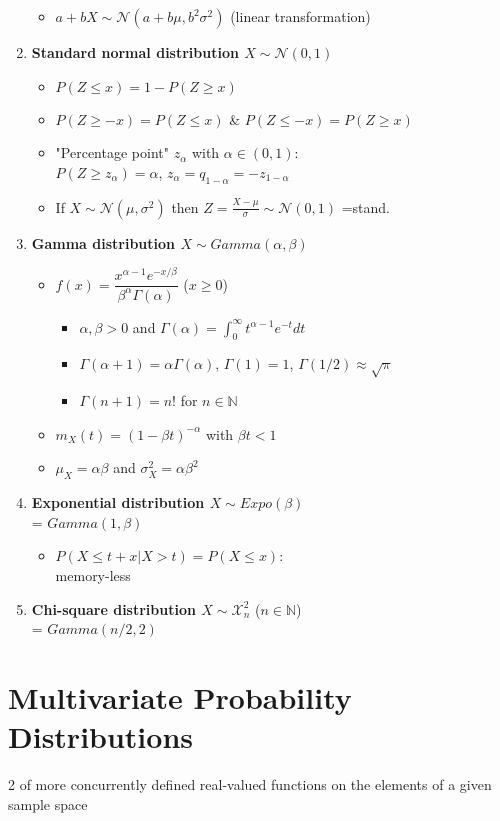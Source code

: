 \documentclass[paper=a4,fontsize=8pt,pagesize,DIV=calc]{scrartcl}
\begin{document}
\begin{multicols}{3}
\begin{enumerate}
\begin{itemize}
\item $a+bX\sim \mathcal{N}(a+b\mu ,b^2 \sigma^2)$ (linear transformation)
\end{itemize}
\item \textbf{Standard normal distribution $X \sim \mathcal{N}(0,1)$}
\begin{itemize}
\item $P(Z\leq x)=1-P(Z\geq x)$
\item $P(Z\geq -x)=P(Z\leq x)$ \& $P(Z\leq -x)=P(Z\geq x)$
\item "Percentage point" $z_\alpha$ with $\alpha \in (0,1)$: \\$P(Z\geq z_\alpha)=\alpha$, $z_\alpha=q_{1-\alpha}=-z_{1-\alpha}$
\item If $X\sim \mathcal{N}(\mu,\sigma^2)$ then $Z=\frac{X-\mu}{\sigma} \sim \mathcal{N}(0,1)$ =stand.
\end{itemize}
\item \textbf{Gamma distribution $X \sim Gamma(\alpha,\beta)$}
\begin{itemize}
\item $f(x)= \dfrac{x^{\alpha-1}e^{-x/\beta}}{\beta^\alpha \Gamma(\alpha)}$ ($x\geq 0$)
\begin{itemize}
\item $\alpha,\beta >0$ and $\Gamma(\alpha)=\int^{\infty}_0 t^{\alpha-1}e^{-t}dt$
\item $\Gamma(\alpha+1)=\alpha \Gamma(\alpha)$, $\Gamma(1)=1$, $\Gamma(1/2)\approx\sqrt{\pi}$
\item $\Gamma(n+1)=n!$ for $n\in \mathbb{N}$
\end{itemize} 
\item $m_X(t)=(1-\beta t)^{-\alpha}$ with $\beta t<1$
\item $\mu_X=\alpha\beta$ and $\sigma^2_X=\alpha\beta^2$
\end{itemize}
\item \textbf{Exponential distribution $X \sim Expo(\beta)$} ~~\\= $Gamma(1,\beta)$
\begin{itemize}
\item $P(X\leq t+x|X>t)=P(X\leq x)$:\\ memory-less
\end{itemize}
\item \textbf{Chi-square distribution $X \sim \mathcal{X}_n^2$} ($n\in \mathbb{N}$)
~~\\= $Gamma(n/2,2)$
\end{enumerate}

\section{Multivariate Probability Distributions}
2 of more concurrently defined real-valued functions on the elements of a given sample space 

\end{multicols}
\end{document}
